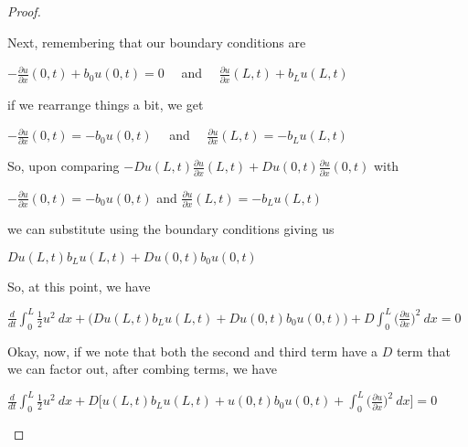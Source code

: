 \documentclass[12pt, executivepaper]{article}
\begin{document}
\begin{flushleft}
\begin{proof}
\begin{center}
\end{center}

Next, remembering that our boundary conditions are

\begin{center}

$-\frac{\partial u}{\partial x}(0,t) + b_{0}u(0,t)=0 \quad$ and $\quad \frac{\partial u}{\partial x}(L,t) + b_{L} u(L,t)$

\end{center}

if we rearrange things a bit, we get

\begin{center}

$-\frac{\partial u}{\partial x}(0,t)=-b_{0}u(0,t) \quad$ and $\quad \frac{\partial u}{\partial x}(L,t)=-b_{L} u(L,t)$

\end{center}

So, upon comparing $-Du(L,t) \frac{\partial u}{\partial x}(L,t) + Du(0,t) \frac{\partial u}{\partial x}(0,t)$ with 

\begin{center}

$-\frac{\partial u}{\partial x}(0,t)=-b_{0}u(0,t)$ and $\frac{\partial u}{\partial x}(L,t)=-b_{L} u(L,t)$

\end{center}

we can substitute using the boundary conditions giving us

\begin{center}

$Du(L,t) b_{L} u(L,t) + Du(0,t) b_{0}u(0,t)$

\end{center}

So, at this point, we have

\begin{center}

$\frac{d}{dt}\int_{0}^{L} \frac{1}{2} u^2 \ dx + \bigg(Du(L,t) b_{L} u(L,t) + Du(0,t) b_{0}u(0,t)\bigg)+ D \int_{0}^{L} \bigg(\frac{\partial u}{\partial x}\bigg)^2 \ dx=0$

\end{center}

Okay, now, if we note that both the second and third term have a $D$ term that we can factor out, after combing terms, we have

\begin{center}

$\frac{d}{dt}\int_{0}^{L} \frac{1}{2} u^2 \ dx + D\bigg[u(L,t) b_{L} u(L,t) + u(0,t) b_{0}u(0,t) + \int_{0}^{L} \bigg(\frac{\partial u}{\partial x}\bigg)^2 \ dx\bigg]=0$


\end{center}
\end{proof}
\end{flushleft}
\end{document}
